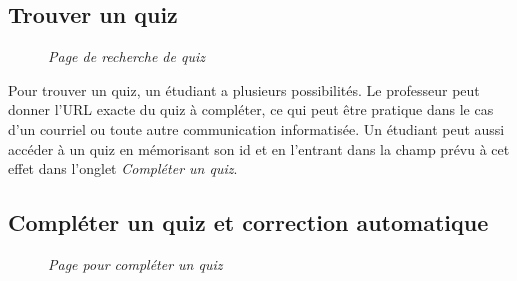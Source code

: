 \documentclass[a4paper,11pt,openany,oneside]{sphinxmanual}
\begin{document}
\subsection{Trouver un quiz}
\label{doc-user:trouver-un-quiz}\begin{figure}[htbp]
\centering
\capstart

\caption{\emph{Page de recherche de quiz}}\end{figure}

Pour trouver un quiz, un étudiant a plusieurs possibilités. Le professeur peut donner l'URL exacte du quiz à compléter, ce qui peut être pratique dans le cas d'un courriel ou toute autre communication informatisée. Un étudiant peut aussi accéder à un quiz en mémorisant son id et en l'entrant dans la champ prévu à cet effet dans l'onglet \emph{Compléter un quiz}.


\subsection{Compléter un quiz et correction automatique}
\label{doc-user:completer-un-quiz-et-correction-automatique}\begin{figure}[htbp]
\centering
\capstart

\caption{\emph{Page pour compléter un quiz}}\end{figure}
\end{document}
